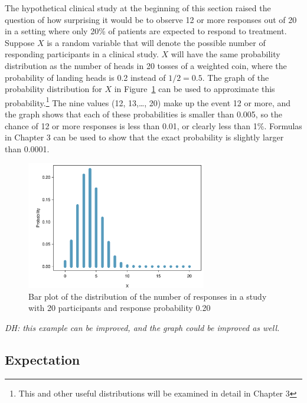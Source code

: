The hypothetical clinical study at the beginning of this section raised the question of how surprising it would be to observe 12 or more responses out of 20 in a setting where only 20\% of patients are expected to respond to treatment.  Suppose $X$ is a random variable that will denote the possible number of responding participants in a clinical study. $X$ will have the same probability distribution as the number of heads in 20 tosses of a weighted coin, where the probability of landing heads is 0.2 instead of $1/2 = 0.5$.  The graph of the probability distribution for $X$ in Figure~\ref{distRespClinStudy} can be used to approximate this probability.\footnote{This and other useful distributions will be examined in detail in Chapter 3} The nine values (12, 13,\ldots, 20) make up the event 12 or more, and the graph shows that each of these probabilities is smaller than 0.005, so the chance of 12 or more responses is less than 0.01, or clearly less than 1\%.  Formulas in Chapter 3 can be used to show that the exact probability is slightly larger than 0.0001.

\begin{figure}[h]
\centering
\includegraphics[width=0.70\textwidth]
{ch_probability_oi_biostat/figures/distRespClinStudy/distRespClinStudy.pdf}
\caption{Bar plot of the distribution of the number of responses in a study with 20 participants and response probability 0.20}
\label{distRespClinStudy}
\end{figure}

 \textit{DH: this example can be improved, and the graph could be improved as well.}


\subsection{Expectation}


